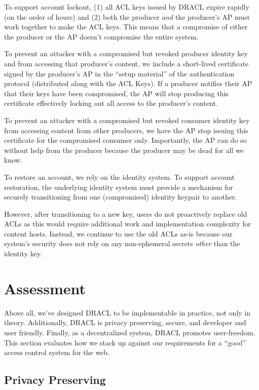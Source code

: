 \documentclass[pdftex,12pt,a4papaer,twoside,notitlepage]{report}
\begin{document}
To support account lockout, (1) all ACL keys issued by DRACL expire rapidly (on
the order of hours) and (2) both the producer \emph{and} the producer's AP must
work together to make the ACL keys. This means that a compromise of either the
producer or the AP doesn't compromise the entire system.

To prevent an attacker with a compromised but revoked producer identity key and
from accessing that producer's content, we include a short-lived certificate
signed by the producer's AP in the ``setup material'' of the authentication
protocol (distributed along with the ACL Keys). If a producer notifies their AP
that their keys have been compromised, the AP will stop producing this
certificate effectively locking out all access to the producer's content.

To prevent an attacker with a compromised but revoked consumer identity key from
accessing content from other producers, we have the AP stop issuing this
certificate for the compromised consumer only. Importantly, the AP can do so
without help from the producer because the producer may be dead for all we know.

To restore an account, we rely on the identity system. To support account
restoration, the underlying identity system must provide a mechanism for
securely transitioning from one (compromised) identity keypair to another.

However, after transitioning to a new key, users do not proactively replace old
ACLs as this would require additional work and implementation complexity for
content hosts. Instead, we continue to use the old ACLs as-is because our
system's security does not rely on any non-ephemeral secrets \emph{other} than
the identity key.

\chapter{Assessment}

Above all, we've designed DRACL to be implementable in practice, not only in
theory. Additionally, DRACL is privacy preserving, secure, and developer and
user friendly. Finally, as a decentralized system, DRACL promotes user-freedom.
This section evaluates how we stack up against our requirements for a ``good''
access control system for the web.

\section{Privacy Preserving}
\label{sec:privacy}
\end{document}
